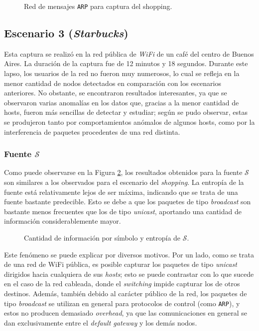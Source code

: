 \begin{figure}[h!]
    \caption{Red de mensajes \texttt{ARP} para captura del shopping.}
    \label{res:esc2:fig3}
\end{figure}

\vfill %

\subsection{Escenario 3 (\emph{Starbucks})}

Esta captura se realizó en la red pública de \emph{WiFi} de un café del centro
de Buenos Aires. La duración de la captura fue de 12 minutos y 18 segundos.
Durante este lapso, los usuarios de la red no fueron muy numerosos, lo cual se
refleja en la menor cantidad de nodos detectados en comparación con los
escenarios anteriores. No obstante, se encontraron resultados interesantes, ya
que se observaron varias anomalías en los datos que, gracias a la menor
cantidad de hosts, fueron más sencillas de detectar y estudiar; según se pudo
observar, estas se produjeron tanto por comportamientos anómalos de algunos
hosts, como por la interferencia de paquetes procedentes de una red distinta.

\subsubsection{Fuente $\mathcal{S}$}

Como puede observarse en la Figura \ref{res:esc3:s}, los resultados
obtenidos para la fuente $\mathcal{S}$ son similares a los observados para el
escenario del \emph{shopping}. La entropía de la fuente está relativamente
lejos de ser máxima, indicando que se trata de una fuente bastante predecible.
Esto se debe a que los paquetes de tipo \emph{broadcast} son bastante menos
frecuentes que los de tipo \emph{unicast}, aportando una cantidad de
información considerablemente mayor.

\begin{figure}[H]
    \caption{Cantidad de información por símbolo y entropía de $\mathcal{S}$.}
    \label{res:esc3:s}
\end{figure}

Este fenómeno se puede explicar por diversos motivos. Por un lado, como se
trata de una red de WiFi pública, es posible capturar los paquetes de tipo
\emph{unicast} dirigidos hacia cualquiera de sus \emph{hosts}; esto se puede
contrastar con lo que sucede en el caso de la red cableada, donde el
\emph{switching} impide capturar los de otros destinos. Además, también debido
al carácter público de la red, los paquetes de tipo
\emph{broadcast} se utilizan en general para protocolos de control (como
\texttt{ARP}), y estos no producen demasiado \emph{overhead}, ya que las
comunicaciones en general se dan exclusivamente entre el \emph{default gateway}
y los demás nodos.

